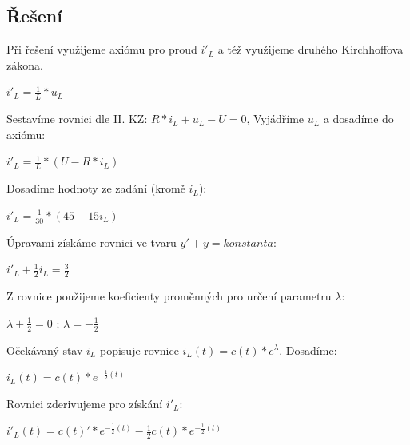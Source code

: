 \documentclass[12pt]{article}
\begin{document}
\subsection{Řešení}
\begin{center}
Při řešení využijeme axiómu pro proud $i'_L$ a též využijeme druhého Kirchhoffova zákona.
\vspace{10px}

\Large$i'_L = \frac{1}{L}*u_L$\\
\vspace{10px}

\normalsize Sestavíme rovnici dle II. KZ: $R*i_L + u_L - U = 0$, Vyjádříme $u_L$ a dosadíme do axiómu:\\
\vspace{10px}

\Large $i'_L = \frac{1}{L}*(U-R*i_L)$
\vspace{10px}

\normalsize Dosadíme hodnoty ze zadání (kromě $i_L$):
\vspace{10px}

\Large $i'_L = \frac{1}{30}*(45-15i_L)$
\vspace{10px}

\normalsize Úpravami získáme rovnici ve tvaru $y' + y = konstanta$:\\
\vspace{10px}

\Large $i'_L + \frac{1}{2}i_L = \frac{3}{2}$\\
\vspace{10px}

\normalsize Z rovnice použijeme koeficienty proměnných pro určení parametru $\lambda$:
\vspace{10px}

\Large $\lambda + \frac{1}{2} = 0$ ; $\lambda = -\frac{1}{2}$\\
\vspace{10px}

\normalsize Očekávaný stav $i_L$ popisuje rovnice $i_L(t) = c(t) * e^\lambda$. Dosadíme:\\
\vspace{10px}

\Large $i_L(t) = c(t) * e^{-\frac{1}{2}(t)}$
\vspace{10px}

\normalsize Rovnici zderivujeme pro získání $i'_L$:\\
\vspace{10px}

\Large $i'_L(t) = c(t)' * e^{-\frac{1}{2}(t)} - \frac{1}{2} c(t) * e^{-\frac{1}{2}(t)}$\\
\vspace{10px}


\end{center}
\end{document}
